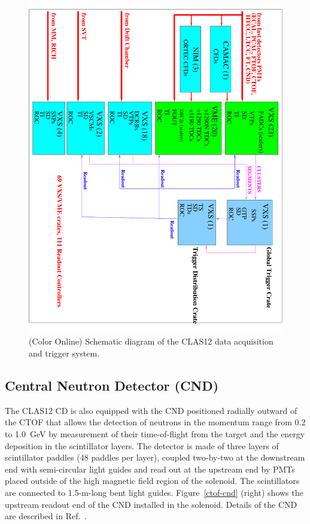 \documentclass[final,3p,twocolumn]{elsarticle}
\begin{document}
\begin{figure}[htbp!]
\centerline{\includegraphics[angle=90,width=1.5\columnwidth]{clas12-daq-1.pdf}}
\caption{(Color Online) Schematic diagram of the CLAS12 data acquisition and trigger system.}
\label{daq}
\end{figure}

\subsection{Central Neutron Detector (CND)}

The CLAS12 CD is also equipped with the CND positioned radially outward of the CTOF that allows the detection
of neutrons in the momentum range from 0.2 to 1.0~GeV by measurement of their time-of-flight from the target
and the energy deposition in the scintillator layers. The detector is made of three layers of scintillator paddles
(48 paddles per layer), coupled two-by-two at the downstream end with semi-circular light guides and read out at
the upstream end by PMTs placed outside of the high magnetic field region of the solenoid. The scintillators are
connected to 1.5-m-long bent light guides. Figure~\ref{ctof-cnd} (right) shows the upstream readout end of the
CND installed in the solenoid. Details of the CND are described in Ref.~\cite{cnd-nim}.
\end{document}
